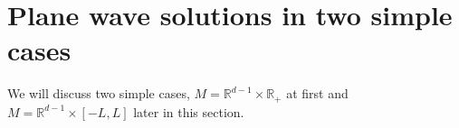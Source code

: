 \section{Plane wave solutions in two simple cases}
We will discuss two simple cases, $M = \mathbb{R}^{d-1} \times \mathbb{R}_+$ at first and $M = \mathbb{R}^{d-1} \times [-L, L]$ later in this section. 






